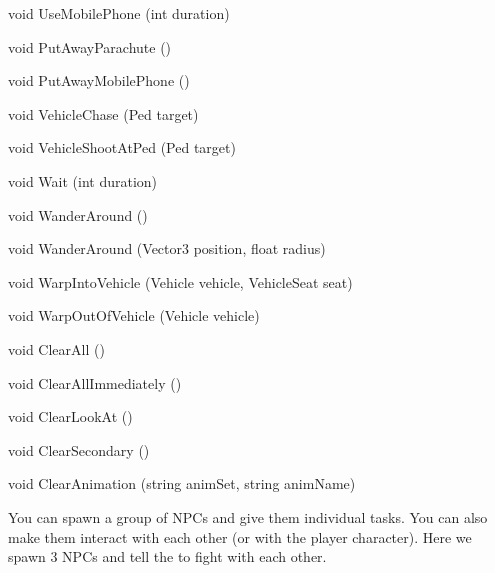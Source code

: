 \documentclass[
  openany]{book}
\newenvironment{Shaded}{\begin{snugshade}}{\end{snugshade}}
\newcommand{\DataTypeTok}[1]{\textcolor[rgb]{0.13,0.29,0.53}{#1}}
\newcommand{\FunctionTok}[1]{\textcolor[rgb]{0.00,0.00,0.00}{#1}}
\newcommand{\NormalTok}[1]{#1}
\begin{document}
\begin{Shaded}
\begin{Highlighting}[]
\DataTypeTok{void} \FunctionTok{UseMobilePhone}\NormalTok{ (}\DataTypeTok{int}\NormalTok{ duration)}
 
\DataTypeTok{void} \FunctionTok{PutAwayParachute}\NormalTok{ ()}
 
\DataTypeTok{void} \FunctionTok{PutAwayMobilePhone}\NormalTok{ ()}
 
\DataTypeTok{void} \FunctionTok{VehicleChase}\NormalTok{ (Ped target)}
 
\DataTypeTok{void} \FunctionTok{VehicleShootAtPed}\NormalTok{ (Ped target)}
 
\DataTypeTok{void} \FunctionTok{Wait}\NormalTok{ (}\DataTypeTok{int}\NormalTok{ duration)}
 
\DataTypeTok{void} \FunctionTok{WanderAround}\NormalTok{ ()}
 
\DataTypeTok{void} \FunctionTok{WanderAround}\NormalTok{ (Vector3 position, }\DataTypeTok{float}\NormalTok{ radius)}
 
\DataTypeTok{void} \FunctionTok{WarpIntoVehicle}\NormalTok{ (Vehicle vehicle, VehicleSeat seat)}
 
\DataTypeTok{void} \FunctionTok{WarpOutOfVehicle}\NormalTok{ (Vehicle vehicle)}
 
\DataTypeTok{void} \FunctionTok{ClearAll}\NormalTok{ ()}
 
\DataTypeTok{void} \FunctionTok{ClearAllImmediately}\NormalTok{ ()}
 
\DataTypeTok{void} \FunctionTok{ClearLookAt}\NormalTok{ ()}
 
\DataTypeTok{void} \FunctionTok{ClearSecondary}\NormalTok{ ()}
 
\DataTypeTok{void} \FunctionTok{ClearAnimation}\NormalTok{ (}\DataTypeTok{string}\NormalTok{ animSet, }\DataTypeTok{string}\NormalTok{ animName)}
\end{Highlighting}
\end{Shaded}

You can spawn a group of NPCs and give them individual tasks. You can also make them interact with each other (or with the player character). Here we spawn 3 NPCs and tell the to fight with each other.
\end{document}

